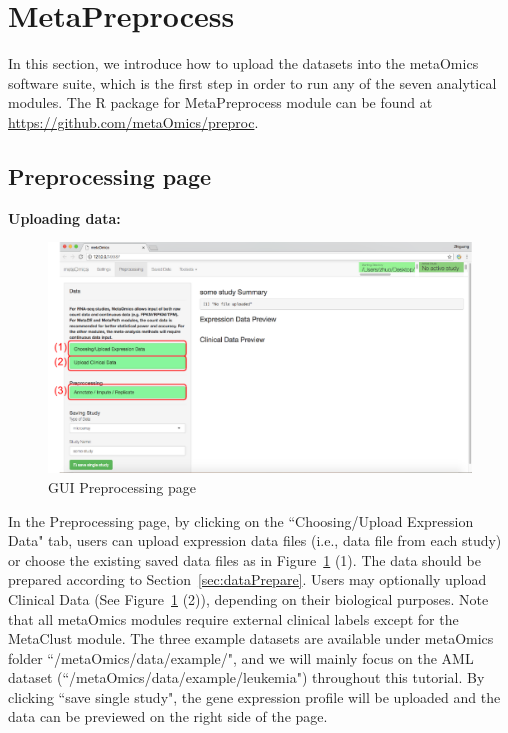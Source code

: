 

\section{MetaPreprocess}

In this section, we introduce how to upload the datasets into the metaOmics software suite,
which is the first step in order to run any of the seven analytical modules.
The R package for MetaPreprocess module can be found at \url{https://github.com/metaOmics/preproc}.

\subsection{Preprocessing page}
\label{sec:procedure}

\begin{steps}
\item \textbf{Uploading data:}

\begin{figure}[!htbp]
\begin{center}
\includegraphics[scale=1]{./figure/preprocessing/GUIpreprocessing}
\caption{GUI Preprocessing page}
\label{fig:GUIpreprocessing}
\end{center}
\end{figure}

In the Preprocessing page,
by clicking on the ``Choosing/Upload Expression Data" tab,
users can upload expression data files (i.e., data file from each study) 
or choose the existing saved data files as in Figure~\ref{fig:GUIpreprocessing} {\color{red} (1)}.
The data should be prepared according to Section~\ref{sec:dataPrepare}.
Users may optionally upload Clinical Data (See Figure~\ref{fig:GUIpreprocessing} {\color{red} (2)}), 
depending on their biological purposes.
Note that all metaOmics modules require external clinical labels except for the MetaClust module.
The three example datasets are available under metaOmics folder ``/metaOmics/data/example/",
and we will mainly focus on the AML dataset (``/metaOmics/data/example/leukemia") throughout this tutorial.
By clicking ``save single study", the gene expression profile will be uploaded and the data can be previewed on the right side of the page.



\end{steps}
